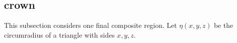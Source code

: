 %
%
%
%

\subsection{crown}

This subsection considers
one final composite region.
Let $\eta(x,y,z)$ be the circumradius of a triangle with
sides $x,y,z$. %

